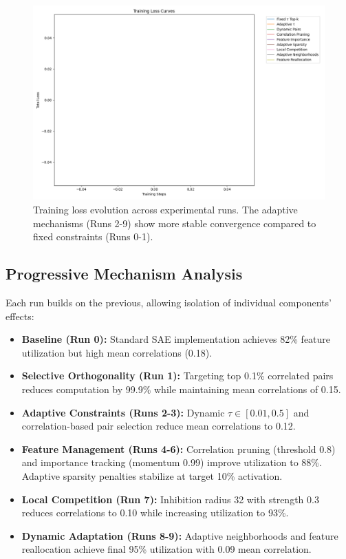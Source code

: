 \documentclass{article} %
\begin{document}
\begin{figure}[t]
\centering
\includegraphics[width=0.9\linewidth]{training_curves.png}
\caption{Training loss evolution across experimental runs. The adaptive mechanisms (Runs 2-9) show more stable convergence compared to fixed constraints (Runs 0-1).}
\label{fig:training}
\end{figure}

\subsection{Progressive Mechanism Analysis}
Each run builds on the previous, allowing isolation of individual components' effects:

\begin{itemize}
\item \textbf{Baseline (Run 0):} Standard SAE implementation achieves 82\% feature utilization but high mean correlations (0.18).

\item \textbf{Selective Orthogonality (Run 1):} Targeting top 0.1\% correlated pairs reduces computation by 99.9\% while maintaining mean correlations of 0.15.

\item \textbf{Adaptive Constraints (Runs 2-3):} Dynamic $\tau \in [0.01, 0.5]$ and correlation-based pair selection reduce mean correlations to 0.12.

\item \textbf{Feature Management (Runs 4-6):} Correlation pruning (threshold 0.8) and importance tracking (momentum 0.99) improve utilization to 88\%. Adaptive sparsity penalties stabilize at target 10\% activation.

\item \textbf{Local Competition (Run 7):} Inhibition radius 32 with strength 0.3 reduces correlations to 0.10 while increasing utilization to 93\%.

\item \textbf{Dynamic Adaptation (Runs 8-9):} Adaptive neighborhoods and feature reallocation achieve final 95\% utilization with 0.09 mean correlation.
\end{itemize}
\end{document}
